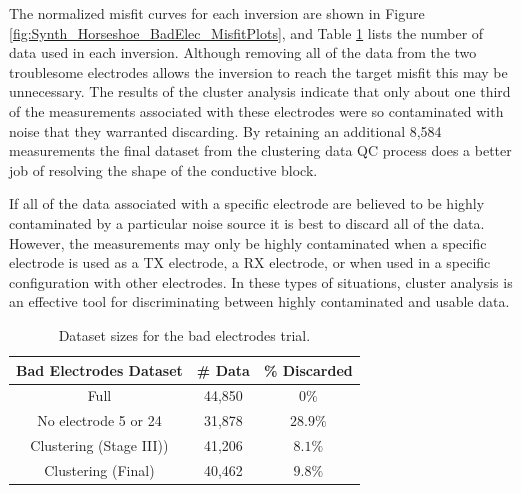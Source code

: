 \documentclass[final,authoryear,5p,times,twocolumn]{elsarticle}
\begin{document}
The normalized misfit curves for each inversion are shown in Figure \ref{fig:Synth_Horseshoe_BadElec_MisfitPlots}, and Table \ref{tab:Synth_BadElec_Sizes} lists the number of data used in each inversion. Although removing all of the data from the two troublesome electrodes allows the inversion to reach the target misfit this may be unnecessary. The results of the cluster analysis indicate that only about one third of the measurements associated with these electrodes were so contaminated with noise that they warranted discarding. By retaining an additional 8,584 measurements the final dataset from the clustering data QC process does a better job of resolving the shape of the conductive block.

If all of the data associated with a specific electrode are believed to be highly contaminated by a particular noise source it is best to discard all of the data. However, the measurements may only be highly contaminated when a specific electrode is used as a TX electrode, a RX electrode, or when used in a specific configuration with other electrodes. In these types of situations, cluster analysis is an effective tool for discriminating between highly contaminated and usable data.

\begin{table}[!ht]
\small
\begin{center}
  \begin{tabular}{| c | c | c |}
    \hline
    \bf{Bad Electrodes Dataset} & \bf{\# Data} &  \bf{\% Discarded} \\
    \hline
    Full & 44,850 & $0 \%$\\
    \hline
    No electrode 5 or 24 & 31,878 & $28.9 \%$\\ %
    \hline
    Clustering (Stage III)) & 41,206 & $8.1 \%$\\
    \hline
    Clustering (Final) & 40,462 & $9.8 \%$\\ %
    \hline
  \end{tabular}
\caption{Dataset sizes for the bad electrodes trial.}
\label{tab:Synth_BadElec_Sizes}
\end{center}
\end{table}
\end{document}
